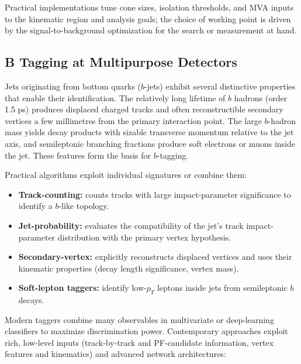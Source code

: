 Practical implementations tune cone sizes, isolation thresholds, and MVA inputs to the kinematic region and analysis goals; the choice of working point is driven by the signal-to-background optimization for the search or measurement at hand.

\subsection{B Tagging at Multipurpose Detectors}

Jets originating from bottom quarks ($b$-jets) exhibit several distinctive properties that enable their identification. The relatively long lifetime of $b$ hadrons (order 1.5 ps) produces displaced charged tracks and often reconstructible secondary vertices a few millimetres from the primary interaction point. The large $b$-hadron mass yields decay products with sizable transverse momentum relative to the jet axis, and semileptonic branching fractions produce soft electrons or muons inside the jet. These features form the basis for $b$-tagging.

Practical algorithms exploit individual signatures or combine them:
\begin{itemize}
  \item \textbf{Track-counting:} counts tracks with large impact-parameter significance to identify a $b$-like topology.
  \item \textbf{Jet-probability:} evaluates the compatibility of the jet's track impact-parameter distribution with the primary vertex hypothesis.
  \item \textbf{Secondary-vertex:} explicitly reconstructs displaced vertices and uses their kinematic properties (decay length significance, vertex mass).
  \item \textbf{Soft-lepton taggers:} identify low-$p_T$ leptons inside jets from semileptonic $b$ decays.
\end{itemize}

Modern taggers combine many observables in multivariate or deep-learning classifiers to maximize discrimination power. Contemporary approaches exploit rich, low-level inputs (track-by-track and PF-candidate information, vertex features and kinematics) and advanced network architectures:

